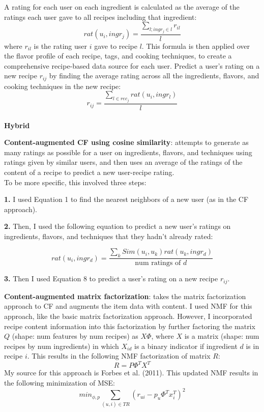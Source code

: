 \documentclass{article}
\begin{document}
A rating for each user on each ingredient is calculated as the average of the ratings each user gave to all recipes including that ingredient:
\begin{equation}
    rat(u_i, ingr_j) = \frac{\sum_{l; ingr_j \in l}r_{il}}{l}
\end{equation} where $r_{il}$ is the rating user $i$ gave to recipe $l$.
This formula is then applied over the flavor profile of each recipe, tags, and cooking techniques, to create a comprehensive recipe-based data source for each user. 
Predict a user's rating on a new recipe $r_{ij}$ by finding the average rating across all the ingredients, flavors, and cooking techniques in the new recipe:
\begin{equation}
    r_{ij} = \frac{\sum_{l\in rec_j} rat(u_i, ingr_l)}{l}
\end{equation}
\vspace{0.1in}
\\
\textbf{Hybrid} 

\vspace{0.1in}
\textbf{Content-augmented CF using cosine similarity}: attempts to generate as many ratings as possible for a user on ingredients, flavors, and techniques using ratings given by similar users, and then uses an average of the ratings of the content of a recipe to predict a new user-recipe rating. 
\\
To be more specific, this involved three steps:

\textbf{1. }  I used Equation 1 to find the nearest neighbors of a new user (as in the CF approach).

\textbf{2.} Then, I used the following equation to predict a new user's ratings on ingredients, flavors, and techniques that they hadn't already rated:

\begin{equation}
    rat(u_i, ingr_d) = \frac{\sum_k Sim(u_i, u_k)rat(u_k, ingr_d)}{\text{num ratings of }d}
\end{equation}

\textbf{3.} Then I used Equation 8 to predict a user's rating on a new recipe $r_{ij}$.

\vspace{0.1in}
\textbf{Content-augmented matrix factorization}: takes the matrix factorization approach to CF and augments the item data with content. I used NMF for this approach, like the basic matrix factorization approach. However, I incorporated recipe content information into this factorization by further factoring the matrix $Q$ (shape: num features by num recipes) as $X\Phi$, where $X$ is a matrix (shape: num recipes by num ingredients) in which $X_{id}$ is a binary indicator if ingredient $d$ is in recipe $i$. This results in the following NMF factorization of matrix $R$:
\begin{equation}
    R = P\Phi^TX^T
\end{equation} My source for this approach is Forbes et al. (2011). This updated NMF results in the following minimization of MSE:
\begin{equation}
   min_{\phi,p} \sum_{(u,i) \in TR} (r_{ui} - p_u\Phi^Tx_i^T)^2 
\end{equation} 
\end{document}
